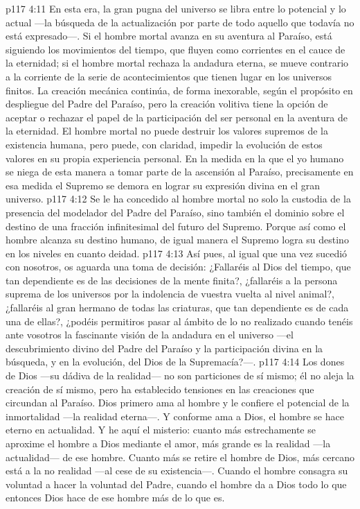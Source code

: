 \vs p117 4:11 \pc En esta era, la gran pugna del universo se libra entre lo potencial y lo actual ---la búsqueda de la actualización por parte de todo aquello que todavía no está expresado---. Si el hombre mortal avanza en su aventura al Paraíso, está siguiendo los movimientos del tiempo, que fluyen como corrientes en el cauce de la eternidad; si el hombre mortal rechaza la andadura eterna, se mueve contrario a la corriente de la serie de acontecimientos que tienen lugar en los universos finitos. La creación mecánica continúa, de forma inexorable, según el propósito en despliegue del Padre del Paraíso, pero la creación volitiva tiene la opción de aceptar o rechazar el papel de la participación del ser personal en la aventura de la eternidad. El hombre mortal no puede destruir los valores supremos de la existencia humana, pero puede, con claridad, impedir la evolución de estos valores en su propia experiencia personal. En la medida en la que el yo humano se niega de esta manera a tomar parte de la ascensión al Paraíso, precisamente en esa medida el Supremo se demora en lograr su expresión divina en el gran universo.
\vs p117 4:12 Se le ha concedido al hombre mortal no solo la custodia de la presencia del modelador del Padre del Paraíso, sino también el dominio sobre el destino de una fracción infinitesimal del futuro del Supremo. Porque así como el hombre alcanza su destino humano, de igual manera el Supremo logra su destino en los niveles en cuanto deidad.
\vs p117 4:13 Así pues, al igual que una vez sucedió con nosotros, os aguarda una toma de decisión: ¿Fallaréis al Dios del tiempo, que tan dependiente es de las decisiones de la mente finita?, ¿fallaréis a la persona suprema de los universos por la indolencia de vuestra vuelta al nivel animal?, ¿fallaréis al gran hermano de todas las criaturas, que tan dependiente es de cada una de ellas?, ¿podéis permitiros pasar al ámbito de lo no realizado cuando tenéis ante vosotros la fascinante visión de la andadura en el universo ---el descubrimiento divino del Padre del Paraíso y la participación divina en la búsqueda, y en la evolución, del Dios de la Supremacía?---.
\vs p117 4:14 \pc Los dones de Dios ---su dádiva de la realidad--- no son particiones de sí mismo; él no aleja la creación de sí mismo, pero ha establecido tensiones en las creaciones que circundan al Paraíso. Dios primero ama al hombre y le confiere el potencial de la inmortalidad ---la realidad eterna---. Y conforme ama a Dios, el hombre se hace eterno en actualidad. Y he aquí el misterio: cuanto más estrechamente se aproxime el hombre a Dios mediante el amor, más grande es la realidad ---la actualidad--- de ese hombre. Cuanto más se retire el hombre de Dios, más cercano está a la no realidad ---al cese de su existencia---. Cuando el hombre consagra su voluntad a hacer la voluntad del Padre, cuando el hombre da a Dios todo lo que  entonces Dios hace de ese hombre más de lo que es.
